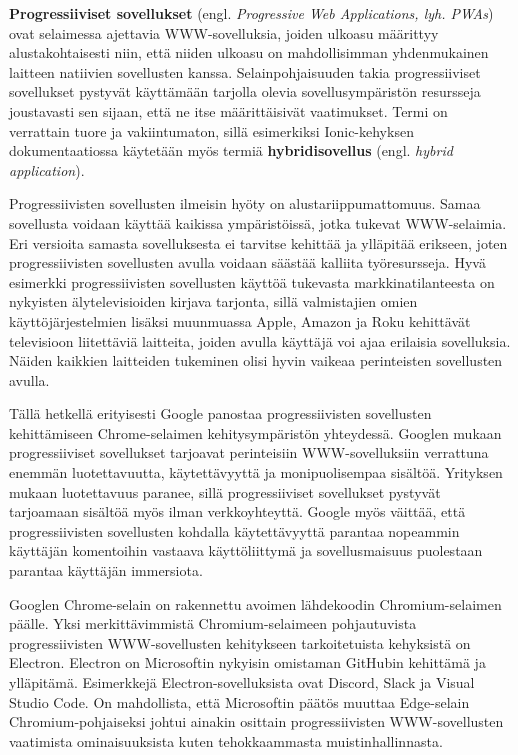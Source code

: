 \documentclass[utf8]{gradu3}
\begin{document}
\textbf{Progressiiviset sovellukset} (engl. \textit{Progressive Web Applications, lyh. PWAs}) ovat selaimessa ajettavia WWW-sovelluksia, joiden ulkoasu määrittyy alustakohtaisesti niin, että niiden ulkoasu on mahdollisimman yhdenmukainen laitteen natiivien sovellusten kanssa. Selainpohjaisuuden takia progressiiviset sovellukset pystyvät käyttämään tarjolla olevia sovellusympäristön resursseja joustavasti sen sijaan, että ne itse määrittäisivät vaatimukset. Termi on verrattain tuore ja vakiintumaton, sillä esimerkiksi Ionic-kehyksen dokumentaatiossa käytetään myös termiä \textbf{hybridisovellus} (engl. \textit{hybrid application}).

Progressiivisten sovellusten ilmeisin hyöty on alustariippumattomuus. Samaa sovellusta voidaan käyttää kaikissa ympäristöissä, jotka tukevat WWW-selaimia. Eri versioita samasta sovelluksesta ei tarvitse kehittää ja ylläpitää erikseen, joten progressiivisten sovellusten avulla voidaan säästää kalliita työresursseja. Hyvä esimerkki progressiivisten sovellusten käyttöä tukevasta markkinatilanteesta on nykyisten älytelevisioiden kirjava tarjonta, sillä valmistajien omien käyttöjärjestelmien lisäksi muunmuassa Apple, Amazon ja Roku kehittävät televisioon liitettäviä laitteita, joiden avulla käyttäjä voi ajaa erilaisia sovelluksia. Näiden kaikkien laitteiden tukeminen olisi hyvin vaikeaa perinteisten sovellusten avulla. \parencite[]{frankston-pwa}

Tällä hetkellä erityisesti Google panostaa progressiivisten sovellusten kehittämiseen Chrome-selaimen kehitysympäristön yhteydessä. Googlen \parencite[]{google-pwa-marketing} mukaan progressiiviset sovellukset tarjoavat perinteisiin WWW-sovelluksiin verrattuna enemmän luotettavuutta, käytettävyyttä ja monipuolisempaa sisältöä. Yrityksen mukaan luotettavuus paranee, sillä progressiiviset sovellukset pystyvät tarjoamaan sisältöä myös ilman verkkoyhteyttä. Google myös väittää, että progressiivisten sovellusten kohdalla käytettävyyttä parantaa nopeammin käyttäjän komentoihin vastaava käyttöliittymä ja sovellusmaisuus puolestaan parantaa käyttäjän immersiota.

Googlen Chrome-selain on rakennettu avoimen lähdekoodin Chromium-selaimen päälle. Yksi merkittävimmistä Chromium-selaimeen pohjautuvista progressiivisten WWW-sovellusten kehitykseen tarkoitetuista kehyksistä on Electron. Electron on Microsoftin nykyisin omistaman GitHubin kehittämä ja ylläpitämä. Esimerkkejä Electron-sovelluksista ovat Discord, Slack ja Visual Studio Code. On mahdollista, että Microsoftin päätös muuttaa Edge-selain Chromium-pohjaiseksi johtui ainakin osittain progressiivisten WWW-sovellusten vaatimista ominaisuuksista kuten tehokkaammasta muistinhallinnasta.
\end{document}
